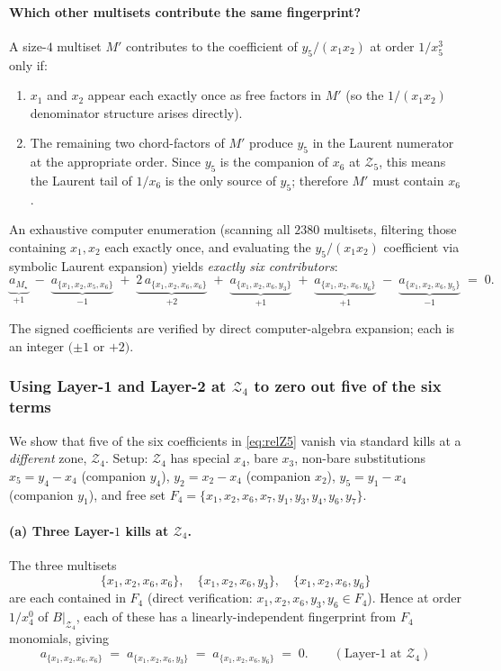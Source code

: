 \documentclass[11pt]{article}
\newcommand{\Zr}{\mathcal{Z}}
\newcommand{\Fr}{F}
\begin{document}
\paragraph{Which other multisets contribute the same fingerprint?}
A size-$4$ multiset $M'$ contributes to the coefficient of $y_5/(x_1 x_2)$
at order $1/x_5^3$ only if:
\begin{enumerate}\setlength\itemsep{0pt}
\item $x_1$ and $x_2$ appear each exactly once as free factors in $M'$
  (so the $1/(x_1 x_2)$ denominator structure arises directly).
\item The remaining two chord-factors of $M'$ produce $y_5$ in the
  Laurent numerator at the appropriate order. Since $y_5$ is the
  companion of $x_6$ at $\Zr_5$, this means the Laurent tail of $1/x_6$
  is the only source of $y_5$; therefore $M'$ must contain $x_6$.
\end{enumerate}

An exhaustive computer enumeration (scanning all $2380$ multisets,
filtering those containing $x_1, x_2$ each exactly once, and evaluating
the $y_5/(x_1 x_2)$ coefficient via symbolic Laurent expansion) yields
\emph{exactly six contributors}:
\begin{equation}\label{eq:relZ5}
\underbrace{a_{M_\star}}_{+1}
\;-\; \underbrace{a_{\{x_1,x_2,x_5,x_6\}}}_{-1}
\;+\; \underbrace{2\, a_{\{x_1,x_2,x_6,x_6\}}}_{+2}
\;+\; \underbrace{a_{\{x_1,x_2,x_6,y_3\}}}_{+1}
\;+\; \underbrace{a_{\{x_1,x_2,x_6,y_6\}}}_{+1}
\;-\; \underbrace{a_{\{x_1,x_2,x_6,y_5\}}}_{-1}
\;=\; 0.
\end{equation}

The signed coefficients are verified by direct computer-algebra
expansion; each is an integer $(\pm 1$ or $+2)$.

\subsubsection*{Using Layer-1 and Layer-2 at $\Zr_4$ to zero out five of
the six terms}

We show that five of the six coefficients in \eqref{eq:relZ5} vanish
via standard kills at a \emph{different} zone, $\Zr_4$. Setup:
$\Zr_4$ has special $x_4$, bare $x_3$, non-bare substitutions
$x_5 = y_4 - x_4$ (companion $y_4$), $y_2 = x_2 - x_4$ (companion $x_2$),
$y_5 = y_1 - x_4$ (companion $y_1$), and free set
$\Fr_4 = \{x_1, x_2, x_6, x_7, y_1, y_3, y_4, y_6, y_7\}$.

\paragraph{(a) Three Layer-$1$ kills at $\Zr_4$.} The three
multisets
\[
\{x_1, x_2, x_6, x_6\},\quad \{x_1, x_2, x_6, y_3\},\quad \{x_1, x_2, x_6, y_6\}
\]
are each contained in $\Fr_4$ (direct verification: $x_1, x_2, x_6, y_3, y_6 \in
\Fr_4$). Hence at order $1/x_4^0$ of $B|_{\Zr_4}$, each of these has a
linearly-independent fingerprint from $\Fr_4$ monomials, giving
\[
a_{\{x_1,x_2,x_6,x_6\}} \;=\; a_{\{x_1,x_2,x_6,y_3\}} \;=\; a_{\{x_1,x_2,x_6,y_6\}}
\;=\; 0. \qquad (\text{Layer-$1$ at } \Zr_4)
\]
\end{document}
